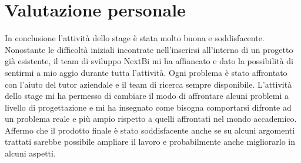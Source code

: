 \section{Valutazione personale}

In conclusione l'attività dello stage è stata molto buona e soddisfacente. Nonostante le difficoltà iniziali incontrate nell'inserirsi all'interno di un progetto già esistente, il team di sviluppo NextBi mi ha affiancato e dato la possibilità di sentirmi a mio aggio durante tutta l'attività.
Ogni problema è stato affrontato con l'aiuto del tutor aziendale e il team di ricerca sempre disponibile.
L'attività dello stage mi ha permesso di cambiare il modo di affrontare alcuni problemi a livello di progettazione e mi ha insegnato come bisogna comportarsi difronte ad un problema reale e più ampio rispetto a quelli affrontati nel mondo accademico. Affermo che il prodotto finale è stato soddisfacente anche se su alcuni argomenti trattati sarebbe possibile ampliare il lavoro e probabilmente anche migliorarlo in alcuni aspetti.







 